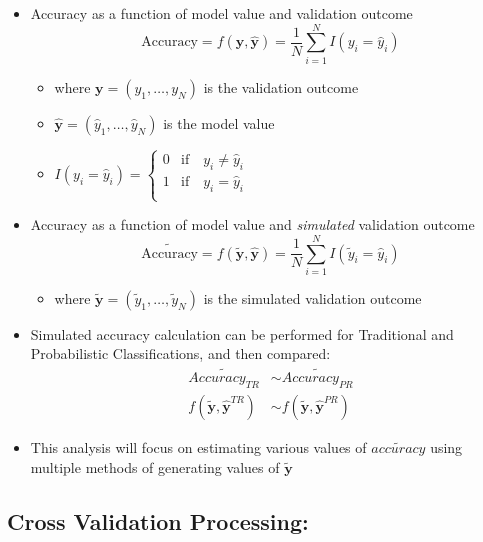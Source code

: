 \documentclass[12pt,]{article}
\providecommand{\tightlist}{%
  \setlength{\itemsep}{0pt}\setlength{\parskip}{0pt}}
\begin{document}
\begin{itemize}
\tightlist
\item
  Accuracy as a function of model value and validation outcome
  \[\text{Accuracy} = f(\mathbf{y}, \mathbf{\hat{y}}) = \frac{1}{N} \sum_{i=1}^{N}  I\left(y_{i}=\hat{y}_{i} \right)\]

  \begin{itemize}
  \tightlist
  \item
    where \(\mathbf{y}=\left(y_{1}, \ldots, y_{N}\right)\) is the
    validation outcome
  \item
    \(\mathbf{\hat{y}}=\left(\hat{y}_{1},\ldots, \hat{y}_{N} \right)\)
    is the model value
  \item
    \(I\left(y_{i}=\hat{y}_{i} \right)=\begin{cases} 0 &\mbox{if} \quad y_{i} \neq \hat{y}_{i} \\ 1 &\mbox{if} \quad y_{i} = \hat{y}_{i} \\ \end{cases}\)
  \end{itemize}
\item
  Accuracy as a function of model value and \textit{simulated}
  validation outcome
  \[\tilde{\text{Accuracy}} = f(\mathbf{\tilde{y}}, \mathbf{\hat{y}}) = \frac{1}{N} \sum_{i=1}^{N}  I\left(\tilde{y}_{i}=\hat{y}_{i} \right)\]

  \begin{itemize}
  \tightlist
  \item
    where
    \(\mathbf{\tilde{y}}=\left(\tilde{y}_{1}, \ldots, \tilde{y}_{N} \right)\)
    is the simulated validation outcome
  \end{itemize}
\item
  Simulated accuracy calculation can be performed for Traditional and
  Probabilistic Classifications, and then compared: \begin{align*}
  \tilde{Accuracy_{TR}} &\sim \tilde{Accuracy_{PR}} \\[0.5em]
  f\left(\mathbf{\tilde{y}}, \mathbf{\hat{y}}^{TR} \right)  &\sim f\left(\mathbf{\tilde{y}}, \mathbf{\hat{y}}^{PR} \right) \tag{EQ-XX} \label{2.1-1}
  \end{align*}
\item
  This analysis will focus on estimating various values of
  \(\tilde{accuracy}\) using multiple methods of generating values of
  \(\tilde{\mathbf{y}}\)
\end{itemize}

\hypertarget{cross-validation-processing}{%
\subsection{Cross Validation
Processing:}\label{cross-validation-processing}}
\end{document}

